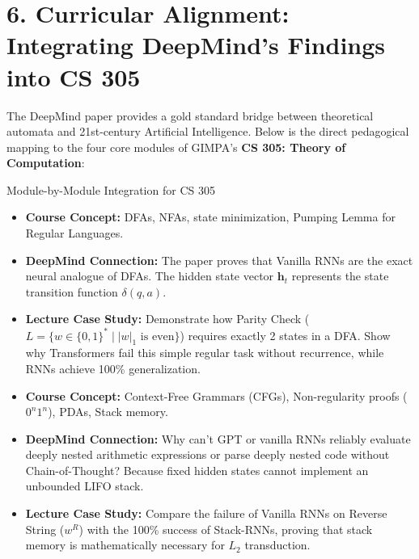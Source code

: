 \documentclass[11pt,a4paper]{article}
\begin{document}
\section{6. Curricular Alignment: Integrating DeepMind's Findings into CS 305}

The DeepMind paper provides a gold standard bridge between theoretical automata and 21st-century Artificial Intelligence. Below is the direct pedagogical mapping to the four core modules of GIMPA's \textbf{CS 305: Theory of Computation}:

\begin{pedagogybox}{Module-by-Module Integration for CS 305}
\begin{description}[leftmargin=1.2em, itemsep=6pt]
    \item[\textbf{Module 1: Regular Languages \& Finite Automata (Weeks 1--4)}]
    \begin{itemize}[leftmargin=1.2em, itemsep=2pt]
        \item \textbf{Course Concept:} DFAs, NFAs, state minimization, Pumping Lemma for Regular Languages.
        \item \textbf{DeepMind Connection:} The paper proves that Vanilla RNNs are the exact neural analogue of DFAs. The hidden state vector $\mathbf{h}_t$ represents the state transition function $\delta(q, a)$.
        \item \textbf{Lecture Case Study:} Demonstrate how Parity Check ($L = \{w \in \{0,1\}^* \mid |w|_1 \text{ is even}\}$) requires exactly 2 states in a DFA. Show why Transformers fail this simple regular task without recurrence, while RNNs achieve 100\% generalization.
    \end{itemize}

    \item[\textbf{Module 2: Context-Free Languages \& Pushdown Automata (Weeks 5--7)}]
    \begin{itemize}[leftmargin=1.2em, itemsep=2pt]
        \item \textbf{Course Concept:} Context-Free Grammars (CFGs), Non-regularity proofs ($0^n 1^n$), PDAs, Stack memory.
        \item \textbf{DeepMind Connection:} Why can't GPT or vanilla RNNs reliably evaluate deeply nested arithmetic expressions or parse deeply nested code without Chain-of-Thought? Because fixed hidden states cannot implement an unbounded LIFO stack.
        \item \textbf{Lecture Case Study:} Compare the failure of Vanilla RNNs on Reverse String ($w^R$) with the 100\% success of Stack-RNNs, proving that stack memory is mathematically necessary for $L_2$ transduction.
    \end{itemize}


\end{description}
\end{pedagogybox}
\end{document}
